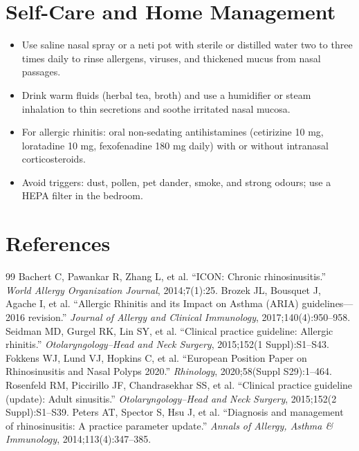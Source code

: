 \section*{Self-Care and Home Management}
\begin{itemize}
  \item Use saline nasal spray or a neti pot with sterile or distilled water two to three times daily to rinse allergens, viruses, and thickened mucus from nasal passages.
  \item Drink warm fluids (herbal tea, broth) and use a humidifier or steam inhalation to thin secretions and soothe irritated nasal mucosa.
  \item For allergic rhinitis: oral non-sedating antihistamines (cetirizine 10 mg, loratadine 10 mg, fexofenadine 180 mg daily) with or without intranasal corticosteroids.
  \item Avoid triggers: dust, pollen, pet dander, smoke, and strong odours; use a HEPA filter in the bedroom.
\end{itemize}

\section*{References}
\begin{thebibliography}{99}
 Bachert C, Pawankar R, Zhang L, et al. ``ICON: Chronic rhinosinusitis.'' \textit{World Allergy Organization Journal}, 2014;7(1):25.
 Brozek JL, Bousquet J, Agache I, et al. ``Allergic Rhinitis and its Impact on Asthma (ARIA) guidelines---2016 revision.'' \textit{Journal of Allergy and Clinical Immunology}, 2017;140(4):950--958.
 Seidman MD, Gurgel RK, Lin SY, et al. ``Clinical practice guideline: Allergic rhinitis.'' \textit{Otolaryngology--Head and Neck Surgery}, 2015;152(1 Suppl):S1--S43.
 Fokkens WJ, Lund VJ, Hopkins C, et al. ``European Position Paper on Rhinosinusitis and Nasal Polyps 2020.'' \textit{Rhinology}, 2020;58(Suppl S29):1--464.
 Rosenfeld RM, Piccirillo JF, Chandrasekhar SS, et al. ``Clinical practice guideline (update): Adult sinusitis.'' \textit{Otolaryngology--Head and Neck Surgery}, 2015;152(2 Suppl):S1--S39.
 Peters AT, Spector S, Hsu J, et al. ``Diagnosis and management of rhinosinusitis: A practice parameter update.'' \textit{Annals of Allergy, Asthma \& Immunology}, 2014;113(4):347--385.
\end{thebibliography}
